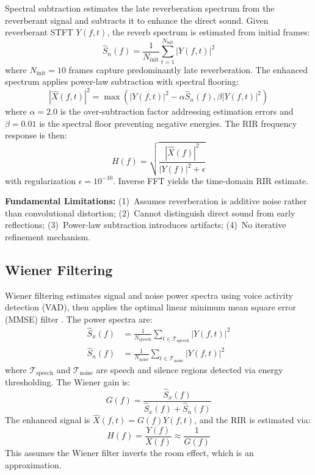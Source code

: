 \documentclass[12pt,a4paper]{article}
\begin{document}
Spectral subtraction \cite{boll1979suppression} estimates the late reverberation spectrum from the reverberant signal and subtracts it to enhance the direct sound. Given reverberant STFT $Y(f,t)$, the reverb spectrum is estimated from initial frames:
\begin{equation}
\hat{S}_n(f) = \frac{1}{N_{\text{init}}}\sum_{t=1}^{N_{\text{init}}} |Y(f,t)|^2
\label{eq:ss_estimate}
\end{equation}
where $N_{\text{init}} = 10$ frames capture predominantly late reverberation. The enhanced spectrum applies power-law subtraction with spectral flooring:
\begin{equation}
|\hat{X}(f,t)|^2 = \max\left(|Y(f,t)|^2 - \alpha \hat{S}_n(f), \beta |Y(f,t)|^2\right)
\label{eq:ss_subtraction}
\end{equation}
where $\alpha = 2.0$ is the over-subtraction factor addressing estimation errors and $\beta = 0.01$ is the spectral floor preventing negative energies. The RIR frequency response is then:
\begin{equation}
H(f) = \sqrt{\frac{|\hat{X}(f)|^2}{|Y(f)|^2 + \epsilon}}
\label{eq:ss_rir_freq}
\end{equation}
with regularization $\epsilon = 10^{-10}$. Inverse FFT yields the time-domain RIR estimate.

\textbf{Fundamental Limitations:} (1)~Assumes reverberation is additive noise rather than convolutional distortion; (2)~Cannot distinguish direct sound from early reflections; (3)~Power-law subtraction introduces artifacts; (4)~No iterative refinement mechanism.

\subsection{Wiener Filtering}

Wiener filtering estimates signal and noise power spectra using voice activity detection (VAD), then applies the optimal linear minimum mean square error (MMSE) filter \cite{gannot2017consolidated,vincent2018audio}. The power spectra are:
\begin{align}
\hat{S}_x(f) &= \frac{1}{N_{\text{speech}}}\sum_{t \in \mathcal{T}_{\text{speech}}} |Y(f,t)|^2 \label{eq:wf_signal} \\
\hat{S}_n(f) &= \frac{1}{N_{\text{noise}}}\sum_{t \in \mathcal{T}_{\text{noise}}} |Y(f,t)|^2 \label{eq:wf_noise}
\end{align}
where $\mathcal{T}_{\text{speech}}$ and $\mathcal{T}_{\text{noise}}$ are speech and silence regions detected via energy thresholding. The Wiener gain is:
\begin{equation}
G(f) = \frac{\hat{S}_x(f)}{\hat{S}_x(f) + \hat{S}_n(f)}
\label{eq:wf_gain}
\end{equation}
The enhanced signal is $\hat{X}(f,t) = G(f) Y(f,t)$, and the RIR is estimated via:
\begin{equation}
H(f) = \frac{Y(f)}{X(f)} \approx \frac{1}{G(f)}
\label{eq:wf_rir}
\end{equation}
This assumes the Wiener filter inverts the room effect, which is an approximation.
\end{document}
